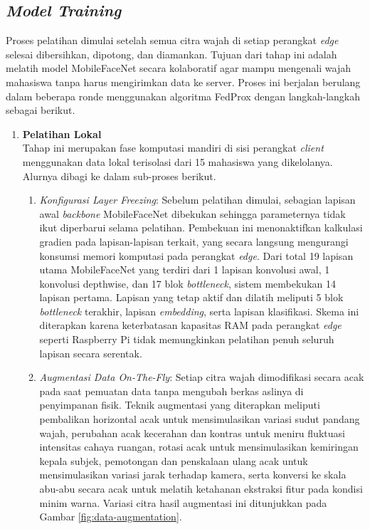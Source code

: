 \subsection{\textit{Model Training}}
\label{subsec:model-training-alur}

Proses pelatihan dimulai setelah semua citra wajah di setiap perangkat \textit{edge} selesai dibersihkan, dipotong, dan diamankan. Tujuan dari tahap ini adalah melatih model MobileFaceNet secara kolaboratif agar mampu mengenali wajah mahasiswa tanpa harus mengirimkan data ke server. Proses ini berjalan berulang dalam beberapa ronde menggunakan algoritma FedProx dengan langkah-langkah sebagai berikut.

\begin{enumerate}
  \item \textbf{Pelatihan Lokal} \\
  Tahap ini merupakan fase komputasi mandiri di sisi perangkat \textit{client} menggunakan data lokal terisolasi dari 15 mahasiswa yang dikelolanya. Alurnya dibagi ke dalam sub-proses berikut.
  \begin{enumerate}
    \item \textit{Konfigurasi Layer Freezing}: Sebelum pelatihan dimulai, sebagian lapisan awal \textit{backbone} MobileFaceNet dibekukan sehingga parameternya tidak ikut diperbarui selama pelatihan. Pembekuan ini menonaktifkan kalkulasi gradien pada lapisan-lapisan terkait, yang secara langsung mengurangi konsumsi memori komputasi pada perangkat \textit{edge}. Dari total 19 lapisan utama MobileFaceNet yang terdiri dari 1 lapisan konvolusi awal, 1 konvolusi depthwise, dan 17 blok \textit{bottleneck}, sistem membekukan 14 lapisan pertama. Lapisan yang tetap aktif dan dilatih meliputi 5 blok \textit{bottleneck} terakhir, lapisan \textit{embedding}, serta lapisan klasifikasi. Skema ini diterapkan karena keterbatasan kapasitas RAM pada perangkat \textit{edge} seperti Raspberry Pi tidak memungkinkan pelatihan penuh seluruh lapisan secara serentak.

    \item \textit{Augmentasi Data On-The-Fly}: Setiap citra wajah dimodifikasi secara acak pada saat pemuatan data tanpa mengubah berkas aslinya di penyimpanan fisik. Teknik augmentasi yang diterapkan meliputi pembalikan horizontal acak untuk mensimulasikan variasi sudut pandang wajah, perubahan acak kecerahan dan kontras untuk meniru fluktuasi intensitas cahaya ruangan, rotasi acak untuk mensimulasikan kemiringan kepala subjek, pemotongan dan penskalaan ulang acak untuk mensimulasikan variasi jarak terhadap kamera, serta konversi ke skala abu-abu secara acak untuk melatih ketahanan ekstraksi fitur pada kondisi minim warna. Variasi citra hasil augmentasi ini ditunjukkan pada Gambar \ref{fig:data-augmentation}.


\end{enumerate}
\end{enumerate}
